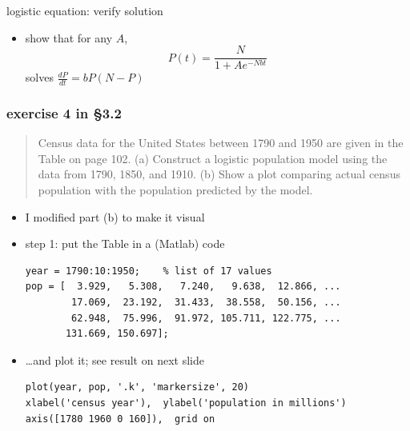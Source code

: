 \documentclass{beamer}
\begin{document}
\begin{frame}{logistic equation: verify solution}

\begin{itemize}
\item show that for any $A$,
    $$P(t)=\frac{N}{1+A e^{-Nbt}}$$
solves $\frac{dP}{dt} = b P \left(N-P\right)$
\end{itemize}

\vspace{50mm}
\end{frame}


\begin{frame}[fragile]

\frametitle{exercise 4 in \S3.2}

\small
\begin{quotation}
\noindent Census data for the United States between 1790 and 1950 are given in the Table on page 102.  (a)   Construct a logistic population model using the data from 1790, 1850, and 1910.  (b)  Show a plot comparing actual census population with the population predicted by the model.
\end{quotation}

\normalsize
\begin{itemize}
\item I modified part (b) to make it visual
\item step 1: put the Table in a (Matlab) code

\begin{Verbatim}[fontsize=\scriptsize]
year = 1790:10:1950;    % list of 17 values
pop = [  3.929,   5.308,   7.240,   9.638,  12.866, ...
        17.069,  23.192,  31.433,  38.558,  50.156, ...
        62.948,  75.996,  91.972, 105.711, 122.775, ...
       131.669, 150.697];
\end{Verbatim}

\item \dots and plot it; see result on next slide

\begin{Verbatim}[fontsize=\scriptsize]
plot(year, pop, '.k', 'markersize', 20)
xlabel('census year'),  ylabel('population in millions')
axis([1780 1960 0 160]),  grid on
\end{Verbatim}
\end{itemize}
\end{frame}
\end{document}
